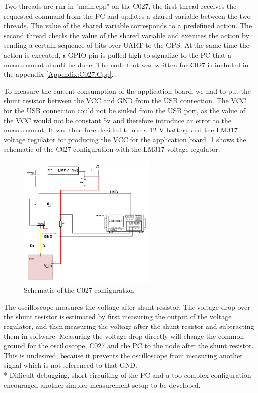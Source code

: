 Two threads are run in "main.cpp" on the C027, the first thread receives the requested command from the PC and updates a shared variable between the two threads. The value of the shared variable corresponds to a predefined action. The second thread checks the value of the shared variable and executes the action by sending a certain sequence of bits over UART to the GPS. At the same time the action is executed, a GPIO pin is pulled high to signalize to the PC that a measurement should be done. The code that was written for C027 is included in the appendix \ref{Appendix:C027.Cpp}. 

To measure the current consumption of the application board, we had to put the shunt resistor between the VCC and GND from the USB connection. The VCC for the USB connection could not be sinked from the USB port, as the value of the VCC would not be constant 5v and therefore introduce an error to the measurement. It was therefore decided to use a 12 V battery and the LM317 voltage regulator for producing the VCC for the application board. \ref{fig:Schematic_C027} shows the schematic of the C027 configuration with the LM317 voltage regulator. 

\begin{figure}[H]
\centering
\includegraphics[height=6.5cm]{Project_Report/Images/C027_Schematic.png}
\caption{Schematic of the C027 configuration}
\label{fig:Schematic_C027}
\end{figure}

The oscilloscope measures the voltage after shunt resistor. The voltage drop over the shunt resistor is estimated by first measuring the output of the voltage regulator, and then measuring the voltage after the shunt resistor and subtracting them in software. Measuring the voltage drop directly will change the common ground for the oscilloscope, C027 and the PC to the node after the shunt resistor. This is undesired, because it prevents the oscilloscope from measuring another signal which is not referenced to that GND. 
\\*
Difficult debugging, short circuiting of the PC and a too complex configuration encouraged another simpler measurement setup to be developed. 



